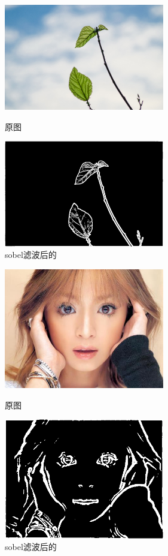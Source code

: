 \documentclass[11pt, a4paper, UTF8]{ctexart}
\begin{document}
\begin{figure}[H]
  \centering
  \begin{minipage}[t]{0.48\textwidth}
  \centering
  \includegraphics[width=7cm]{leaf.jpg}
  \caption{原图}
  \end{minipage}
  \begin{minipage}[t]{0.48\textwidth}
  \centering
  \includegraphics[width=7cm]{sobel_all_leaf.png}
  \caption{sobel滤波后的}
  \end{minipage}
\end{figure}


\begin{figure}[H]
  \centering
  \begin{minipage}[t]{0.48\textwidth}
  \centering
  \includegraphics[width=7cm]{ayu.jpg}
  \caption{原图}
  \end{minipage}
  \begin{minipage}[t]{0.48\textwidth}
  \centering
  \includegraphics[width=7cm]{sobel_all_ayu.png}
  \caption{sobel滤波后的}
  \end{minipage}
\end{figure}
\end{document}
